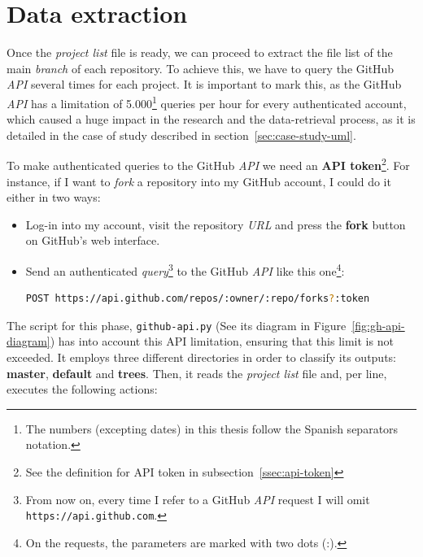 \documentclass[a4paper, 12pt]{book}
\begin{document}
\section{Data extraction}
Once the \emph{project list} file is ready, we can proceed to extract the file list of the main \textit{branch} of each
repository. To achieve this, we have to query the GitHub \textit{API} several times for each project.
It is important to mark this, as the GitHub \textit{API} has a limitation of
5.000\footnote{The numbers (excepting dates) in this thesis follow the Spanish separators notation.}
queries per hour for every authenticated account, which caused a huge impact in the research and the data-retrieval
process, as it is detailed in the case of study described in section~\ref{sec:case-study-uml}.\par
To make authenticated queries to the GitHub \textit{API} we need an \textbf{API token}\footnote{See the definition for API token in subsection~\ref{ssec:api-token}}.
For instance, if I want to \textit{fork} a repository into my GitHub account, I could do it either in two ways:
\begin{itemize}
  \item Log-in into my account, visit the repository \emph{URL} and press the \textbf{fork} button on GitHub's web interface.
  \item Send an authenticated \textit{query}\footnote{From now on, every time I refer to a GitHub \textit{API}
  request I will omit \texttt{https://api.github.com}.}
  to the GitHub \textit{API} like this one\footnote{On the requests, the parameters are marked with two dots (:).}:
  \begin{lstlisting}[language=bash]
  POST https://api.github.com/repos/:owner/:repo/forks?:token \end{lstlisting}
\end{itemize}
The script for this phase, \texttt{github-api.py} (See its diagram in Figure~\ref{fig:gh-api-diagram}) has into account
this API limitation, ensuring that this limit is not exceeded. It employs three different directories in order to classify its outputs:
\textbf{master}, \textbf{default} and \textbf{trees}.
Then, it reads the \emph{project list} file and, per line, executes the following actions:
\end{document}

